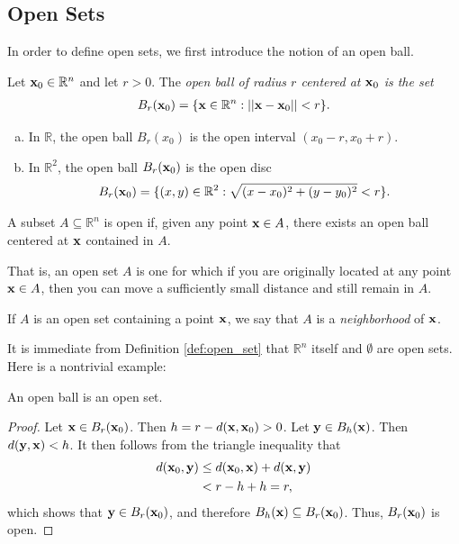 \documentclass[12pt,letterpaper,reqno]{article}
\numberwithin{equation}{section}
\newcommand{\R}{\ensuremath{\mathbb R}}
\newcommand{\bx}{{\bf x}}
\newcommand{\by}{{\bf y}}
\begin{document}
{\subsection{Open Sets}
In order to define open sets, we first introduce the notion of an open ball.

\begin{defn}
	Let $\bx_0 \in \R^n$ and let $r>0$. The \emph{open ball of radius $r$ centered at $\bx_0$ is the set}	
	\begin{align*}
		B_r(\bx_0)=\{ \bx \in \R^n:||\bx-\bx_0||<r \}.
	\end{align*}	
\end{defn}

\begin{example}\hspace{15cm}
	\begin{enumerate}[(a)]
		\item In $\R$, the open ball $B_r(x_0)$ is the open interval $(x_0-r,x_0+r)$.
		\item In $\R^2$, the open ball $B_r(\bx_0)$ is the open disc
		\begin{align*}
			B_r(\bx_0)=\{(x,y) \in \R^2:\sqrt{(x-x_0)^2+(y-y_0)^2}<r\}.
		\end{align*}
	\end{enumerate}
\end{example}

\begin{defn}\label{def:open_set}
	A subset $A \subseteq \R^n$ is open if, given any point $\bx \in A$, there exists an open ball centered at $\bx$ contained in $A$.
\end{defn}
That is, an open set $A$ is one for which if you are originally located at any point $\bx \in A$, then you can move a sufficiently small distance and still remain in $A$. 

\begin{defn}[Neighborhood]
If $A$ is an open set containing a point $\bx$, we say that $A$ is a \emph{neighborhood} of $\bx$.	
\end{defn}


It is immediate from Definition \ref{def:open_set} that $\R^n$ itself and $\emptyset$ are open sets. Here is a nontrivial example:

\begin{prop}\label{prop:open_ball_is_open}
An open ball is an open set.	
\end{prop}

\begin{proof}
	Let $\bx \in B_r(\bx_0)$. Then $h=r-d(\bx,\bx_0)>0$. Let $\by \in B_h(\bx)$. Then $d(\by,\bx)<h$. It then follows from the triangle inequality that
	\begin{align*}
		d(\bx_0,\by) &\leq d(\bx_0,\bx)+d(\bx,\by) \\
		&<r-h+h=r,
	\end{align*}
	which shows that $\by \in B_r(\bx_0)$, and therefore $B_h(\bx) \subseteq B_r(\bx_0)$. Thus, $B_r(\bx_0)$ is open.
\end{proof}

}
\end{document}
